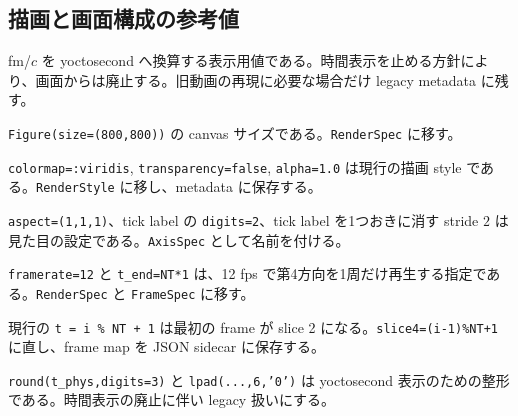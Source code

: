 \documentclass[uplatex,dvipdfmx,ja=standard,11pt,a4paper]{bxjsarticle}
\newcommand{\code}[1]{\texttt{#1}}
\begin{document}
\subsection{描画と画面構成の参考値}
\begin{description}[style=nextline,leftmargin=7em,labelwidth=6em]
  \item[\code{LtoSec=10/3}] fm/\(c\) を yoctosecond へ換算する表示用値である。時間表示を止める方針により、画面からは廃止する。旧動画の再現に必要な場合だけ legacy metadata に残す。
  \item[\(800\times800\)] \code{Figure(size=(800,800))} の canvas サイズである。\code{RenderSpec} に移す。
  \item[色と透明度] \code{colormap=:viridis}, \code{transparency=false}, \code{alpha=1.0} は現行の描画 style である。\code{RenderStyle} に移し、metadata に保存する。
  \item[軸設定] \code{aspect=(1,1,1)}、tick label の \code{digits=2}、tick label を1つおきに消す stride \(2\) は見た目の設定である。\code{AxisSpec} として名前を付ける。
  \item[動画設定] \code{framerate=12} と \code{t\_end=NT*1} は、12 fps で第4方向を1周だけ再生する指定である。\code{RenderSpec} と \code{FrameSpec} に移す。
  \item[フレーム順序] 現行の \code{t = i \% NT + 1} は最初の frame が slice 2 になる。\code{slice4=(i-1)\%NT+1} に直し、frame map を JSON sidecar に保存する。
  \item[時刻整形] \code{round(t\_phys,digits=3)} と \code{lpad(...,6,'0')} は yoctosecond 表示のための整形である。時間表示の廃止に伴い legacy 扱いにする。
\end{description}
\end{document}
